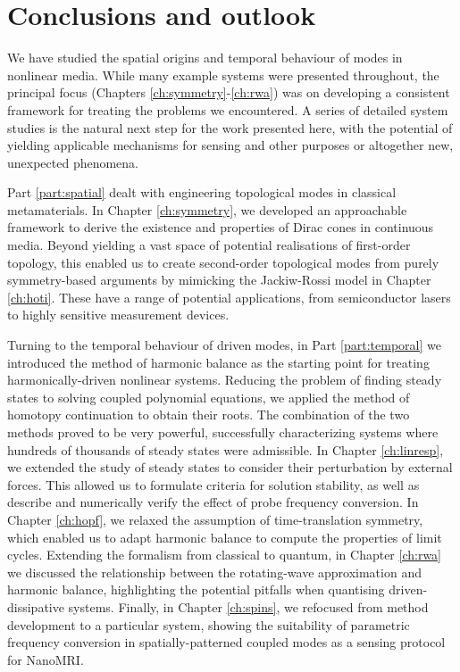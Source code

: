 
\chapter*{Conclusions and outlook}

We have studied the spatial origins and temporal behaviour of modes in nonlinear media. While many example systems were presented throughout, the principal focus (Chapters \ref{ch:symmetry}-\ref{ch:rwa}) was on developing a consistent framework for treating the problems we encountered. A series of detailed system studies is the natural next step for the work presented here, with the potential of yielding applicable mechanisms for sensing and other purposes or altogether new, unexpected phenomena. 

Part \ref{part:spatial} dealt with engineering topological modes in classical metamaterials. In Chapter \ref{ch:symmetry}, we developed an approachable framework to derive the existence and properties of Dirac cones in continuous media. Beyond yielding a vast space of potential realisations of first-order topology, this enabled us to create second-order topological modes from purely symmetry-based arguments by mimicking the Jackiw-Rossi model in Chapter \ref{ch:hoti}. These have a range of potential applications, from semiconductor lasers to highly sensitive measurement devices. 

Turning to the temporal behaviour of driven modes, in Part \ref{part:temporal} we introduced the method of harmonic balance as the starting point for treating harmonically-driven nonlinear systems. Reducing the problem of finding steady states to solving coupled polynomial equations, we applied the method of homotopy continuation to obtain their roots. The combination of the two methods proved to be very powerful, successfully characterizing systems where hundreds of thousands of steady states were admissible. In Chapter \ref{ch:linresp}, we extended the study of steady states to consider their perturbation by external forces. This allowed us to formulate criteria for solution stability, as well as describe and numerically verify the effect of probe frequency conversion. In Chapter \ref{ch:hopf}, we relaxed the assumption of time-translation symmetry, which enabled us to adapt harmonic balance to compute the properties of limit cycles. Extending the formalism from classical to quantum, in Chapter \ref{ch:rwa} we discussed the relationship between the rotating-wave approximation and harmonic balance, highlighting the potential pitfalls when quantising driven-dissipative systems. Finally, in Chapter \ref{ch:spins}, we refocused from method development to a particular system, showing the suitability of parametric frequency conversion in spatially-patterned coupled modes as a sensing protocol for NanoMRI. 


